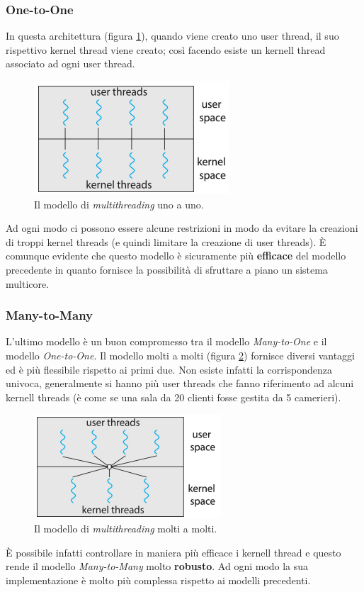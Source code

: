 \subsubsection{One-to-One}
In questa architettura (figura \ref{fig:one_to_one}), quando viene creato uno user thread, il suo rispettivo kernel thread viene creato; così facendo esiste un kernell thread associato ad ogni user thread. 
\begin{figure}[!h]
    \centering
    \includegraphics[width = .5\textwidth]{../res/imgs/threads/one_to_one.png}
    \caption{Il modello di \textit{multithreading} uno a uno.}
    \label{fig:one_to_one}
\end{figure}
Ad ogni modo ci possono essere alcune restrizioni in modo da evitare la creazioni di troppi kernel threads (e quindi limitare la creazione di user threads). È comunque evidente che questo modello è sicuramente più \textbf{efficace} del modello precedente in quanto fornisce la possibilità di sfruttare a piano un sistema multicore.
% 
\subsubsection{Many-to-Many}
L'ultimo modello è un buon compromesso tra il modello \textit{Many-to-One} e il modello \textit{One-to-One}. Il modello molti a molti (figura \ref{fig:many_to_many}) fornisce diversi vantaggi ed è più flessibile rispetto ai primi due. Non esiste infatti la corrispondenza univoca, generalmente si hanno più user threads che fanno riferimento ad alcuni kernell threads (è come se una sala da 20 clienti fosse gestita da 5 camerieri). 
\begin{figure}[!h]
    \centering
    \includegraphics[width = .5\textwidth]{../res/imgs/threads/many_to_many.png}
    \caption{Il modello di \textit{multithreading} molti a molti.}
    \label{fig:many_to_many}
\end{figure}
È possibile infatti controllare in maniera più efficace i kernell thread e questo rende il modello \textit{Many-to-Many} molto \textbf{robusto}. Ad ogni modo la sua implementazione è molto più complessa rispetto ai modelli precedenti.

